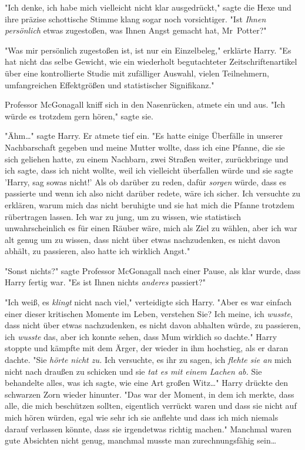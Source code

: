 {"Ich denke, ich habe mich vielleicht nicht klar ausgedrückt," sagte die Hexe und ihre präzise schottische Stimme klang sogar noch vorsichtiger. "Ist \emph{Ihnen persönlich} etwas zugestoßen, was Ihnen Angst gemacht hat, Mr~Potter?"

"Was mir persönlich zugestoßen ist, ist nur ein Einzelbeleg," erklärte Harry. "Es hat nicht das selbe Gewicht, wie ein wiederholt begutachteter Zeitschriftenartikel über eine kontrollierte Studie mit zufälliger Auswahl, vielen Teilnehmern, umfangreichen Effektgrößen und statistischer Signifikanz."

Professor McGonagall kniff sich in den Nasenrücken, atmete ein und aus. "Ich würde es trotzdem gern hören," sagte sie.

"Ähm…" sagte Harry. Er atmete tief ein. "Es hatte einige Überfälle in unserer Nachbarschaft gegeben und meine Mutter wollte, dass ich eine Pfanne, die sie sich geliehen hatte, zu einem Nachbarn, zwei Straßen weiter, zurückbringe und ich sagte, dass ich nicht wollte, weil ich vielleicht überfallen würde und sie sagte 'Harry, sag sowas nicht!' Als ob darüber zu reden, dafür \emph{sorgen} würde, dass es passierte und wenn ich also nicht darüber redete, wäre ich sicher. Ich versuchte zu erklären, warum mich das nicht beruhigte und sie hat mich die Pfanne trotzdem rübertragen lassen. Ich war zu jung, um zu wissen, wie statistisch unwahrscheinlich es für einen Räuber wäre, mich als Ziel zu wählen, aber ich war alt genug um zu wissen, dass nicht über etwas nachzudenken, es nicht davon abhält, zu passieren, also hatte ich wirklich Angst."

"Sonst nichts?" sagte Professor McGonagall nach einer Pause, als klar wurde, dass Harry fertig war. "Es ist Ihnen nichts \emph{anderes} passiert?"

"Ich weiß, es \emph{klingt} nicht nach viel," verteidigte sich Harry. "Aber es war einfach einer dieser kritischen Momente im Leben, verstehen Sie? Ich meine, ich \emph{wusste}, dass nicht über etwas nachzudenken, es nicht davon abhalten würde, zu passieren, ich \emph{wusste} das, aber ich konnte sehen, dass Mum wirklich so dachte." Harry stoppte und kämpfte mit dem Ärger, der wieder in ihm hochstieg, als er daran dachte. "Sie \emph{hörte nicht zu.} Ich versuchte, es ihr zu sagen, ich \emph{flehte sie an} mich nicht nach draußen zu schicken und sie \emph{tat es mit einem Lachen ab.} Sie behandelte alles, was ich sagte, wie eine Art großen Witz…" Harry drückte den schwarzen Zorn wieder hinunter. "Das war der Moment, in dem ich merkte, dass alle, die mich beschützen sollten, eigentlich verrückt waren und dass sie nicht auf mich hören würden, egal wie sehr ich sie anflehte und dass ich mich niemals darauf verlassen könnte, dass sie irgendetwas richtig machen." Manchmal waren gute Absichten nicht genug, manchmal musste man zurechnungsfähig sein…

}
